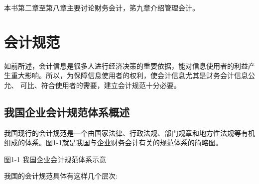 			本书第二章至第八章主要讨论财务会计，笫九章介绍管理会计。

			\section{会计规范}

			如前所述，会计信息是很多人进行经济决策的重要依据，能对信息使用者的利益产 生重大影响。所以，为保障信息使用者的权利，使会计信息尤其是财务会计信息公允、 可比、符合使用者的需要，建立会计规范十分必要。

			\subsection{我国企业会计规范体系概述}
				我国现行的会计规范是一个由国家法律、行政法规、部门规章和地方性法规等有机 组成的体系。图1-1就是我国与企业财务会计有关的规范体系的简略图。

				图1-1 我国企业会计规范体系示意

				我国的会计规范具体有这样几个层次:

